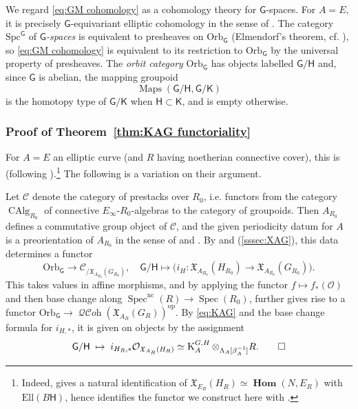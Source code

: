 \documentclass[12pt, oneside]{amsart}
\numberwithin{equation}{section}
\theoremstyle{remark}
\theoremstyle{plain}
\DeclareMathOperator{\QCOH}{\mathcal{QC}\textit{oh}}
\DeclareMathOperator{\Map}{Maps}
\DeclareMathOperator{\HOM}{\mathbf{Hom}}
\newcommand{\frX}{\mathfrak{X}}
\newcommand{\lam}{\Lambda}
\newcommand{\OO}{\mathcal{O}}
\DeclareMathOperator{\spc}{Spec}
\newcommand{\Specnc}{\operatorname{Spec}^{\mathrm{nc}}}
\newcommand{\CAlg}{\operatorname{CAlg}}
\newcommand{\K}{\operatorname{K}}
\begin{document}
We regard \eqref{eq:GM cohomology} as a cohomology theory for $\mathsf{G}$-spaces.
For $A=E$, it is precisely $\mathsf{G}$-equivariant elliptic cohomology in the sense of \cite{LurieEllSurv,GepMei}.
The category $\mathrm{Spc}^{\mathsf{G}}$ of \emph{$\mathsf{G}$-spaces} is equivalent to presheaves on $\mathrm{Orb}_{\mathsf{G}}$ (Elmendorf's theorem, cf. \cite[Constr.~6.4]{GepMei}), so \eqref{eq:GM cohomology} is equivalent to its restriction to $\mathrm{Orb}_{\mathsf{G}}$ by the universal property of presheaves.
The \emph{orbit category} $\mathrm{Orb}_{\mathsf{G}}$ has objects labelled $\mathsf{G}/\mathsf{H}$ and, since $\mathsf{G}$ is abelian, the mapping groupoid
\[
  \Map(\mathsf{G}/\mathsf{H}, \mathsf{G}/\mathsf{K})
\]
is the homotopy type of $\mathsf{G}/\mathsf{K}$ when $\mathsf{H} \subset \mathsf{K}$, and is empty otherwise.

\subsubsection{Proof of Theorem~\ref{thm:KAG functoriality}}

For $A=E$ an elliptic curve (and $R$ having noetherian connective cover), this is \cite[Constr.~6.4]{GepMei} (following \cite{LurieEllSurv}).\footnote{%
  Indeed, \cite[Ex.~6.2]{GepMei} gives a natural identification of $\frX_{E_R}(H_R) \simeq \HOM(N, E_R)$ with $\mathrm{Ell}(B\mathsf{H})$, hence identifies the functor we construct here with \cite[Constr.~6.4]{GepMei}.
}
The following is a variation on their argument.

Let $\mathcal{C}$ denote the category of prestacks over $R_0$, i.e. functors from the category $\CAlg_{R_0}$ of connective $E_\infty$-$R_0$-algebras to the category of groupoids.
Then $A_{R_0}$ defines a commutative group object of $\mathcal{C}$, and the given periodicity datum for $A$ is a preorientation of $A_{R_0}$ in the sense of \cite[Def.~7.2.1]{LurieEll2} and \cite[Def.~3.6]{GepMei}.
By \cite[Prop.~2.16, Constr.~3.13, Prop.~3.15]{GepMei} and (\ref{sssec:XAG}), this data determines a functor
\[
  \mathrm{Orb}_{\mathsf{G}} \to \mathcal{C}_{/\frX_{A_{R_0}}(G_{R_0})},
  \quad
  \mathsf{G}/\mathsf{H} \mapsto \bigl(i_H : \frX_{A_{R_0}}(H_{R_0}) \to \frX_{A_{R_0}}(G_{R_0})\bigr).
\]
This takes values in affine morphisms, and by applying the functor $f \mapsto f_*(\OO)$ and then base change along $\Specnc(R) \to \spc(R_0)$, further gives rise to a functor $\mathrm{Orb}_{\mathsf{G}} \to \QCOH(\frX_{A_R}(G_R))^{\mathrm{op}}$.
By \eqref{eq:KAG} and the base change formula for $i_{H,*}$, it is given on objects by the assignment
\[
  \mathsf{G}/\mathsf{H}
  \;\mapsto\;
  i_{H_R,*}\OO_{\frX_{A_R}(H_R)} \simeq \K_A^{G,H} \otimes_{\lam_A[\beta_A^{-1}]} R.
  \qed
\]
\end{document}
